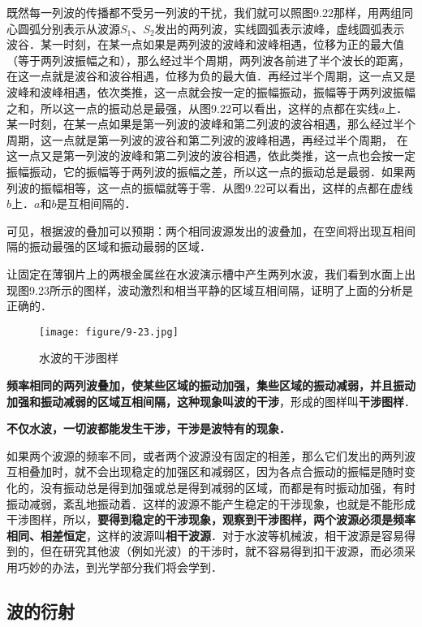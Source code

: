 既然每一列波的传播都不受另一列波的干扰，我们就可以照图9.22那样，用两组同心圆弧分别表示从波源$S_1$、$S_2$发出的两列波，实线圆弧表示波峰，虚线圆弧表示波谷．某一时刻，在某一点如果是两列波的波峰和波峰相遇，位移为正的最大值（等于两列波振幅之和），那么经过半个周期，两列波各前进了半个波长的距离，在这一点就是波谷和波谷相遇，位移为负的最大值．再经过半个周期，这一点又是波峰和波峰相遇，依次类推，这一点就会按一定的振幅振动，振幅等于两列波振幅之和，所以这一点的振动总是最强，从图9.22可以看出，这样的点都在实线$a$上．某一时刻，在某一点如果是第一列波的波峰和第二列波的波谷相遇，那么经过半个周期，这一点就是第一列波的波谷和第二列波的波峰相遇，再经过半个周期，
在这一点又是第一列波的波峰和第二列波的波谷相遇，依此类推，这一点也会按一定振幅振动，它的振幅等于两列波的振幅之差，所以这一点的振动总是最弱．如果两列波的振幅相等，这一点的振幅就等于零．从图9.22可以看出，这样的点都在虚线$b$上．$a$和$b$是互相间隔的．

可见，根据波的叠加可以预期：两个相同波源发出的波叠加，在空间将出现互相间隔的振动最强的区域和振动最弱的区域．

让固定在薄钢片上的两根金属丝在水波演示槽中产生两列水波，我们看到水面上出现图9.23所示的图样，波动激烈和相当平静的区域互相间隔，证明了上面的分析是正确的．
\begin{figure}[H]\centering
    \texttt{[image: figure/9-23.jpg]}
    \caption{水波的干涉图样}
\end{figure}

\textbf{频率相同的两列波叠加，使某些区域的振动加强，集些区域的振动减弱，并且振动加强和振动减弱的区域互相间隔，这种现象叫波的干涉}，形成的图样叫\textbf{干涉图样}．

\textbf{不仅水波，一切波都能发生干涉，干涉是波特有的现象．}

如果两个波源的频率不同，或者两个波源没有固定的相差，那么它们发出的两列波互相叠加时，就不会出现稳定的加强区和减弱区，因为各点合振动的振幅是随时变化的，没有振动总是得到加强或总是得到减弱的区域，而都是有时振动加强，有时振动减弱，紊乱地振动着．这样的波源不能产生稳定的干涉现象，也就是不能形成干涉图样，所以，\textbf{要得到稳定的干涉现象，观察到干涉图样，两个波源必须是频率相同、相差恒定}，这样的波源叫\textbf{相干波源}．对于水波等机械波，相干波源是容易得到的，但在研究其他波（例如光波）的干涉时，就不容易得到扣干波源，而必须采用巧妙的办法，到光学部分我们将会学到．

\subsection{波的衍射}

